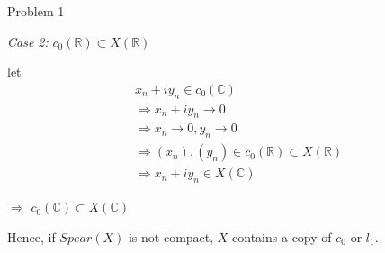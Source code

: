 \documentclass{beamer}
\begin{document}
\begin{frame}{Problem 1}
    \begin{tcolorbox}
        \textit{Case 2:} $c_0(\mathbb{R}) \subset X(\mathbb{R})$

        let 
        \useshortskip
        \begin{align}
            & x_n + i y_n \in c_0(\mathbb{C})\\
            & \Rightarrow x_n+iy_n \longrightarrow 0\\
            & \Rightarrow x_n \longrightarrow 0, y_n \longrightarrow 0\\
            & \Rightarrow (x_n),(y_n) \in c_0(\mathbb{R})\subset X(\mathbb{R})\\
            & \Rightarrow x_n + iy_n \in X(\mathbb{C})
        \end{align}

        $\Rightarrow$ $c_0(\mathbb{C}) \subset X(\mathbb{C})$

        Hence, if $Spear(X)$ is not compact, $X$ contains a copy of $c_0$ or $l_1$.
    \end{tcolorbox}
\end{frame}
\end{document}
